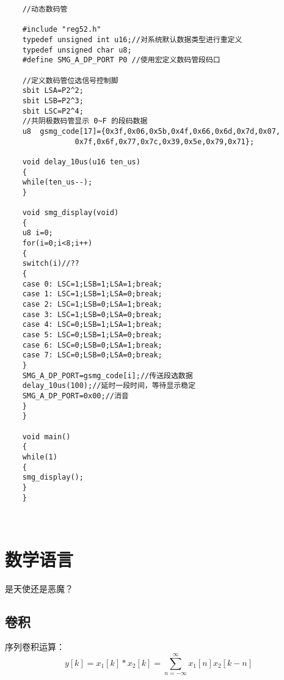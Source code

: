 \documentclass[cn,11pt]{elegantbook}
\begin{document}
\begin{lstlisting}
    //动态数码管

    #include "reg52.h"
    typedef unsigned int u16;//对系统默认数据类型进行重定义
    typedef unsigned char u8;
    #define SMG_A_DP_PORT P0 //使用宏定义数码管段码口
    
    //定义数码管位选信号控制脚
    sbit LSA=P2^2;
    sbit LSB=P2^3;
    sbit LSC=P2^4;
    //共阴极数码管显示 0~F 的段码数据
    u8  gsmg_code[17]={0x3f,0x06,0x5b,0x4f,0x66,0x6d,0x7d,0x07,
                0x7f,0x6f,0x77,0x7c,0x39,0x5e,0x79,0x71};
                
    void delay_10us(u16 ten_us)
    {
    while(ten_us--);
    }
    
    void smg_display(void)
    {
    u8 i=0;
    for(i=0;i<8;i++)
    {
    switch(i)//??
    {
    case 0: LSC=1;LSB=1;LSA=1;break;
    case 1: LSC=1;LSB=1;LSA=0;break;
    case 2: LSC=1;LSB=0;LSA=1;break;
    case 3: LSC=1;LSB=0;LSA=0;break;
    case 4: LSC=0;LSB=1;LSA=1;break;
    case 5: LSC=0;LSB=1;LSA=0;break;
    case 6: LSC=0;LSB=0;LSA=1;break;
    case 7: LSC=0;LSB=0;LSA=0;break;
    }
    SMG_A_DP_PORT=gsmg_code[i];//传送段选数据
    delay_10us(100);//延时一段时间，等待显示稳定
    SMG_A_DP_PORT=0x00;//消音
    }
    }
    
    void main()
    {
    while(1)
    {
    smg_display();
    }
    }
    
    

\end{lstlisting}



























\chapter{数学语言}
是天使还是恶魔？


\section{卷积}


序列卷积运算：
\begin{equation}
y[k]=x_1[k]*x_2[k] =\sum_{n=-\infty}^{\infty}x_1[n]x_2[k-n]
\end{equation}
\end{document}
